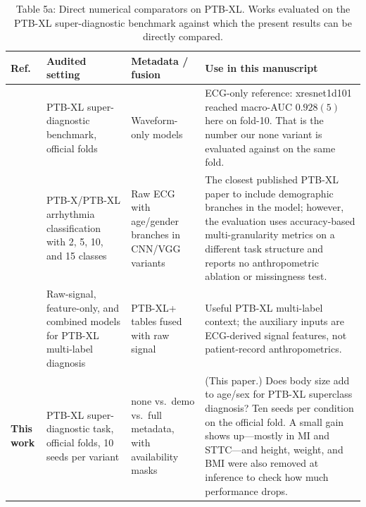 \documentclass[mathematics,article,submit,pdftex]{Definitions/mdpi}
\def\texttt#1{#1}%
\begin{document}
\begin{table}[htbp]
\caption{Table 5a: Direct numerical comparators on PTB-XL. Works evaluated on the PTB-XL super-diagnostic benchmark against which the present results can be directly compared.}
\label{tab:prior_a}
\centering
\scriptsize
\setlength{\tabcolsep}{3pt}
\begin{tabularx}{\textwidth}{>{\raggedright\arraybackslash}p{}>{\raggedright\arraybackslash}p{}>{\raggedright\arraybackslash}p{}>{\raggedright\arraybackslash}X}
\toprule
\textbf{Ref.} & \textbf{Audited setting} & \textbf{Metadata / fusion} & \textbf{Use in this manuscript} \\
\midrule
\cite{Strodthoff2021} & PTB-XL super-diagnostic benchmark, official folds & Waveform-only models & ECG-only reference: xresnet1d101 reached macro-AUC $0.928(5)$ here on fold-10. That is the number our \texttt{none} variant is evaluated against on the same fold. \\
\cite{Atwa2025} & PTB-X/PTB-XL arrhythmia classification with 2, 5, 10, and 15 classes & Raw ECG with age/gender branches in CNN/VGG variants & The closest published PTB-XL paper to include demographic branches in the model; however, the evaluation uses accuracy-based multi-granularity metrics on a different task structure and reports no anthropometric ablation or missingness test. \\
\cite{Holloway2026} & Raw-signal, feature-only, and combined models for PTB-XL multi-label diagnosis & PTB-XL+ tables fused with raw signal & Useful PTB-XL multi-label context; the auxiliary inputs are ECG-derived signal features, not patient-record anthropometrics. \\
\midrule
\textbf{This work} & PTB-XL super-diagnostic task, official folds, 10 seeds per variant & none vs.\ demo vs.\ full metadata, with availability masks & (This paper.) Does body size add to age/sex for PTB-XL superclass diagnosis? Ten seeds per condition on the official fold. A small gain shows up---mostly in MI and STTC---and height, weight, and BMI were also removed at inference to check how much performance drops. \\
\bottomrule
\end{tabularx}
\end{table}
\end{document}
